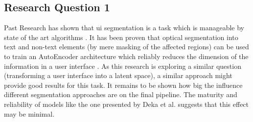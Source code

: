 \documentclass[10pt,a4paper]{scrartcl} %
\begin{document}
\subsection{Research Question 1}
%
Past Research has shown that \ac{ui} segmentation is a task which is manageable by state of the art algorithms \cite{10.1145/3126594.3126651}. It has been proven that optical segmentation into text and non-text elements (by mere masking of the affected regions) can be used to train an AutoEncoder architecture which reliably reduces the dimension 
of the information in a user interface \cite{10.1145/3126594.3126651}. As this research is exploring a similar question (transforming a user interface into a latent space), a similar approach might provide good results for this task.
It remains to be shown how big the influence different segmentation approaches are on the final pipeline. The maturity and reliability of models like the one presented by Deka et al. \cite{10.1145/3126594.3126651} suggests that this effect may be minimal.
\end{document}
